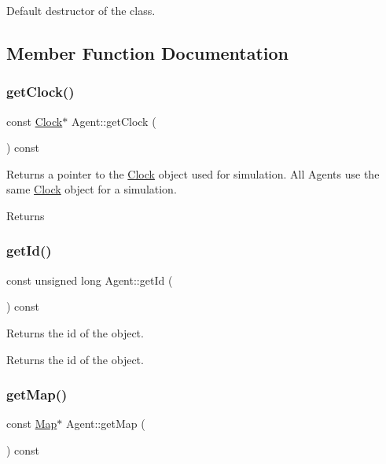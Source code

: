 Default destructor of the class. 

\subsection{Member Function Documentation}
\mbox{\label{class_agent_af80a21a067d04788c23d719d07b04038}} 
\subsubsection{\texorpdfstring{get\+Clock()}{getClock()}}
{\footnotesize\ttfamily const \hyperlink{class_clock}{Clock}$\ast$ Agent\+::get\+Clock (\begin{DoxyParamCaption}{ }\end{DoxyParamCaption}) const}

Returns a pointer to the \hyperlink{class_clock}{Clock} object used for simulation. All Agents use the same \hyperlink{class_clock}{Clock} object for a simulation. \begin{DoxyReturn}{Returns}

\end{DoxyReturn}
\mbox{\label{class_agent_a51d2d781636f524dc151f3da10955613}} 
\subsubsection{\texorpdfstring{get\+Id()}{getId()}}
{\footnotesize\ttfamily const unsigned long Agent\+::get\+Id (\begin{DoxyParamCaption}{ }\end{DoxyParamCaption}) const}

Returns the id of the object. \begin{DoxyReturn}{Returns}
the id of the object. 
\end{DoxyReturn}
\mbox{\label{class_agent_ad1870edeea33b059eca75079be2eb002}} 
\subsubsection{\texorpdfstring{get\+Map()}{getMap()}}
{\footnotesize\ttfamily const \hyperlink{class_map}{Map}$\ast$ Agent\+::get\+Map (\begin{DoxyParamCaption}{ }\end{DoxyParamCaption}) const}

